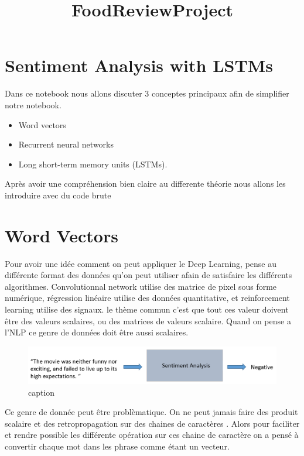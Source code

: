 \documentclass[11pt]{article}
\title{FoodReviewProject}
\makeatletter
\def\maxwidth{\ifdim\Gin@nat@width>\linewidth\linewidth
    \else\Gin@nat@width\fi}
\let\Oldincludegraphics\includegraphics
\renewcommand{\includegraphics}[1]{\Oldincludegraphics[width=.8\maxwidth]{#1}}
\providecommand{\tightlist}{%
      \setlength{\itemsep}{0pt}\setlength{\parskip}{0pt}}
\makeatother
\begin{document}
    
    
    \maketitle
    
    

    
    \section{Sentiment Analysis with
LSTMs}\label{sentiment-analysis-with-lstms}

    Dans ce notebook nous allons discuter 3 conceptes principaux afin de
simplifier notre notebook.

\begin{itemize}
\tightlist
\item
  Word vectors
\item
  Recurrent neural networks
\item
  Long short-term memory units (LSTMs).
\end{itemize}

Après avoir une compréhension bien claire au differente théorie nous
allons les introduire avec du code brute

    \section{Word Vectors}\label{word-vectors}

    Pour avoir une idée comment on peut appliquer le Deep Learning, pense au
différente format des données qu'on peut utiliser afain de satisfaire
les différents algorithmes. Convolutionnal network utilise des matrice
de pixel sous forme numérique, régression linéaire utilise des données
quantitative, et reinforcement learning utilise des signaux. le thème
commun c'est que tout ces valeur doivent être des valeurs scalaires, ou
des matrices de valeurs scalaire. Quand on pense a l'NLP ce genre de
données doit être aussi scalaires.

\begin{figure}
\centering
\includegraphics{Images/SentimentAnalysis.png}
\caption{caption}
\end{figure}

Ce genre de donnée peut être problèmatique. On ne peut jamais faire des
produit scalaire et des retropropagation sur des chaines de caractères .
Alors pour faciliter et rendre possible les différente opération sur ces
chaine de caractère on a pensé à convertir chaque mot dans les phrase
comme étant un vecteur.
\end{document}
